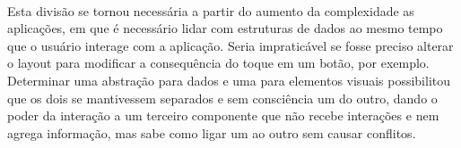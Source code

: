 \documentclass[a4paper,12pt,brazil,doubleside]{book}
\begin{document}
\paragraph{}Esta divisão se tornou necessária a partir do aumento da complexidade as aplicações, em que é necessário lidar com estruturas de dados ao mesmo tempo que o usuário interage com a aplicação. Seria impraticável se fosse preciso alterar o layout para modificar a consequência do toque em um botão, por exemplo. Determinar uma abstração para dados e uma para elementos visuais possibilitou que os dois se mantivessem separados e sem consciência um do outro, dando o poder da interação a um terceiro componente que não recebe interações e nem agrega informação, mas sabe como ligar um ao outro sem causar conflitos.






\singlespace
{}
\cleardoublepage
\thispagestyle{empty}
{}


\doublespace
\end{document}
